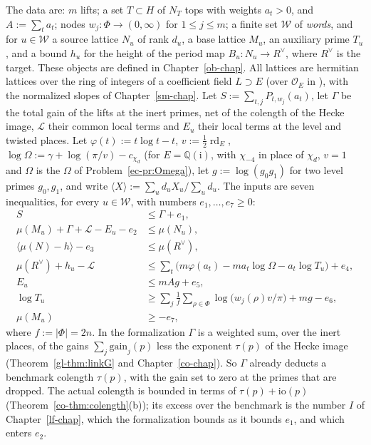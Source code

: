 \documentclass[reqno]{amsart}
\newcounter{chap}
\theoremstyle{definition}
\theoremstyle{plain}
\newcommand{\Q}{\mathbb{Q}}
\newcommand{\Oc}{\mathcal{O}}
\newcommand{\Lc}{\mathcal{L}}
\newcommand{\Wc}{\mathcal{W}}
\newcommand{\rd}{\operatorname{rd}}
\newcommand{\ph}{\varphi}
\newcommand{\ii}{\mathrm{i}}
\begin{document}
The data are: \(m\) lifts; a set \(T \subset H\) of \(N_T\) tops with weights \(a_t > 0\), and \(A := \sum_t a_t\); nodes \(w_j \colon \Phi \to (0,\infty)\) for \(1 \le j \le m\); a finite set \(\Wc\) of \emph{words}, and for \(u \in \Wc\) a source lattice \(N_u\) of rank \(d_u\), a base lattice \(M_u\), an auxiliary prime \(T_u\), and a bound \(h_u\) for the height of the period map \(B_u \colon N_u \to R^\vee\), where \(R^\vee\) is the target.  These objects are defined in Chapter~\ref{ob-chap}.  All lattices are hermitian lattices over the ring of integers of a coefficient field \(L \supset E\) (over \(\Oc_E\) in \cite[Def.~18.9]{Adr}), with the normalized slopes of Chapter~\ref{sm-chap}.  Let \(S := \sum_{t,j} P_{t,w_j}(a_t)\), let \(\Gamma\) be the total gain of the lifts at the inert primes, net of the colength of the Hecke image, \(\Lc\) their common local terms and \(E_u\) their local terms at the level and twisted places.  Let \(\ph(t) := t\log t - t\), \(v := \frac12 \rd_E\), \(\log\Omega := \gamma + \log(\pi/v) - c_{\chi_d}\) (for \(E = \Q(\ii)\), with \(\chi_{-4}\) in place of \(\chi_d\), \(v = 1\) and \(\Omega\) is the \(\Omega\) of Problem~\ref{ec-pr:Omega}), let \(g := \log(g_0g_1)\) for two level primes \(g_0, g_1\), and write \(\langle X \rangle := \sum_u d_uX_u / \sum_u d_u\).  The inputs are seven inequalities, for every \(u \in \Wc\), with numbers \(e_1, \dots, e_7 \ge 0\):
\begin{align}
  S &\le \Gamma + e_1 , \tag{A1}\label{A1}\\
  \mu(M_u) + \Gamma + \Lc - E_u - e_2 &\le \mu(N_u) , \tag{A2}\label{A2}\\
  \langle \mu(N) - h \rangle - e_3 &\le \mu(R^\vee) , \tag{A3}\label{A3}\\
  \mu(R^\vee) + h_u - \Lc &\le \textstyle\sum_{t} \bigl( m\ph(a_t) - m a_t \log\Omega - a_t\log T_u \bigr) + e_4 , \tag{A4}\label{A4}\\
  E_u &\le mAg + e_5 , \tag{A5}\label{A5}\\
  \log T_u &\ge \textstyle\sum_{j} \frac{1}{f}\sum_{\rho\in\Phi} \log\bigl(w_j(\rho)v/\pi\bigr) + mg - e_6 , \tag{A6}\label{A6}\\
  \mu(M_u) &\ge -e_7 , \tag{A7}\label{A7}
\end{align}
where \(f := \lvert\Phi\rvert = 2n\).  In the formalization \(\Gamma\) is a weighted sum, over the inert places, of the gains \(\sum_j \mathrm{gain}_j(p)\) less the exponent \(\tau(p)\) of the Hecke image (Theorem~\ref{gl-thm:linkG} and Chapter~\ref{co-chap}).  So \(\Gamma\) already deducts a benchmark colength \(\tau(p)\), with the gain set to zero at the primes that are dropped.  The actual colength is bounded in terms of \(\tau(p) + \mathrm{io}(p)\) (Theorem~\ref{co-thm:colength}(b)); its excess over the benchmark is the number \(I\) of Chapter~\ref{lf-chap}, which the formalization bounds as it bounds \(e_1\), and which enters \(e_2\).
\end{document}
